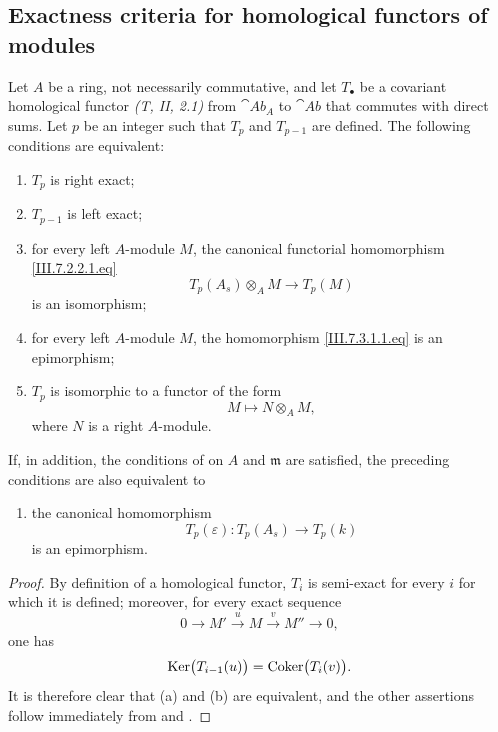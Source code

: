 \subsection{Exactness criteria for homological functors of modules}
\label{subsection:III.7.3}

\begin{proposition}[7.3.1]
\label{III.7.3.1}
Let $A$ be a ring, not necessarily commutative, and let
$T_\bullet$ be a covariant homological functor
\emph{(T, II, 2.1)} from $\cat{Ab}_A$ to $\cat{Ab}$ that
commutes with direct sums.  Let $p$ be an integer such that
$T_p$ and $T_{p-1}$ are defined.  The following conditions are
equivalent:
\begin{enumerate}
  \item[(a)] $T_p$ is right exact;
  \item[(b)] $T_{p-1}$ is left exact;


  \item[(c)] for every left $A$-module $M$, the canonical
    functorial homomorphism \eqref{III.7.2.2.1.eq}
    \[
      T_p(A_s)\otimes_A M
      \longrightarrow
      T_p(M)
      \tag{7.3.1.1}\label{III.7.3.1.1.eq}
    \]
    is an isomorphism;
  \item[(d)] for every left $A$-module $M$, the homomorphism
    \eqref{III.7.3.1.1.eq} is an epimorphism;
  \item[(e)] $T_p$ is isomorphic to a functor of the form
    \[
      M\longmapsto N\otimes_A M,
    \]
    where $N$ is a right $A$-module.
\end{enumerate}
If, in addition, the conditions of  on $A$ and
$\mathfrak m$ are satisfied, the preceding conditions are also
equivalent to
\begin{enumerate}
  \item[(f)] the canonical homomorphism
    \[
      T_p(\varepsilon):T_p(A_s)\longrightarrow T_p(k)
    \]
    is an epimorphism.
\end{enumerate}
\end{proposition}

\begin{proof}
By definition of a homological functor, $T_i$ is semi-exact for
every $i$ for which it is defined; moreover, for every exact
sequence
\[
  0\longrightarrow M'
  \xrightarrow{u}M
  \xrightarrow{v}M''
  \longrightarrow0,
\]
one has
\[
  \operatorname{Ker}\bigl(T_{i-1}(u)\bigr)
  =
  \operatorname{Coker}\bigl(T_i(v)\bigr).
\]
It is therefore clear that (a) and (b) are equivalent, and the
other assertions follow immediately from  and
.
\end{proof}

